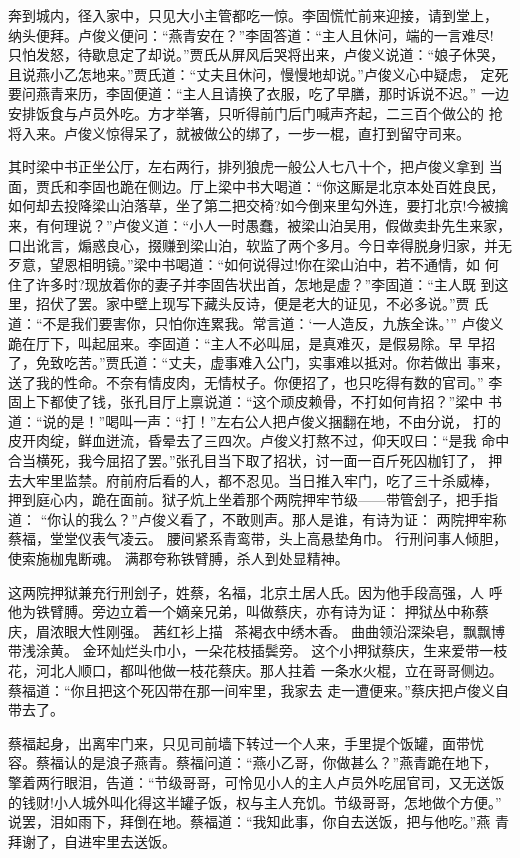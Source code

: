 奔到城内，径入家中，只见大小主管都吃一惊。李固慌忙前来迎接，请到堂上，
纳头便拜。卢俊义便问：“燕青安在？”李固答道：“主人且休问，端的一言难尽!
只怕发怒，待歇息定了却说。”贾氏从屏风后哭将出来，卢俊义说道：“娘子休哭，
且说燕小乙怎地来。”贾氏道：“丈夫且休问，慢慢地却说。”卢俊义心中疑虑，
定死要问燕青来历，李固便道：“主人且请换了衣服，吃了早膳，那时诉说不迟。”
一边安排饭食与卢员外吃。方才举箸，只听得前门后门喊声齐起，二三百个做公的
抢将入来。卢俊义惊得呆了，就被做公的绑了，一步一棍，直打到留守司来。

其时梁中书正坐公厅，左右两行，排列狼虎一般公人七八十个，把卢俊义拿到
当面，贾氏和李固也跪在侧边。厅上梁中书大喝道：“你这厮是北京本处百姓良民，
如何却去投降梁山泊落草，坐了第二把交椅?如今倒来里勾外连，要打北京!今被擒
来，有何理说？”卢俊义道：“小人一时愚蠢，被梁山泊吴用，假做卖卦先生来家，
口出讹言，煽惑良心，掇赚到梁山泊，软监了两个多月。今日幸得脱身归家，并无
歹意，望恩相明镜。”梁中书喝道：“如何说得过!你在梁山泊中，若不通情，如
何住了许多时?现放着你的妻子并李固告状出首，怎地是虚？”李固道：“主人既
到这里，招伏了罢。家中壁上现写下藏头反诗，便是老大的证见，不必多说。”贾
氏道：“不是我们要害你，只怕你连累我。常言道：‘一人造反，九族全诛。’”
卢俊义跪在厅下，叫起屈来。李固道：“主人不必叫屈，是真难灭，是假易除。早
早招了，免致吃苦。”贾氏道：“丈夫，虚事难入公门，实事难以抵对。你若做出
事来，送了我的性命。不奈有情皮肉，无情杖子。你便招了，也只吃得有数的官司。”
李固上下都使了钱，张孔目厅上禀说道：“这个顽皮赖骨，不打如何肯招？”梁中
书道：“说的是！”喝叫一声：“打！”左右公人把卢俊义捆翻在地，不由分说，
打的皮开肉绽，鲜血迸流，昏晕去了三四次。卢俊义打熬不过，仰天叹曰：“是我
命中合当横死，我今屈招了罢。”张孔目当下取了招状，讨一面一百斤死囚枷钉了，
押去大牢里监禁。府前府后看的人，都不忍见。当日推入牢门，吃了三十杀威棒，
押到庭心内，跪在面前。狱子炕上坐着那个两院押牢节级——带管刽子，把手指道：
“你认的我么？”卢俊义看了，不敢则声。那人是谁，有诗为证：
两院押牢称蔡福，堂堂仪表气凌云。
腰间紧系青鸾带，头上高悬垫角巾。
行刑问事人倾胆，使索施枷鬼断魂。
满郡夸称铁臂膊，杀人到处显精神。

这两院押狱兼充行刑刽子，姓蔡，名福，北京土居人氏。因为他手段高强，人
呼他为铁臂膊。旁边立着一个嫡亲兄弟，叫做蔡庆，亦有诗为证：
押狱丛中称蔡庆，眉浓眼大性刚强。
茜红衫上描，茶褐衣中绣木香。
曲曲领沿深染皂，飘飘博带浅涂黄。
金环灿烂头巾小，一朵花枝插鬓旁。
这个小押狱蔡庆，生来爱带一枝花，河北人顺口，都叫他做一枝花蔡庆。那人拄着
一条水火棍，立在哥哥侧边。蔡福道：“你且把这个死囚带在那一间牢里，我家去
走一遭便来。”蔡庆把卢俊义自带去了。

蔡福起身，出离牢门来，只见司前墙下转过一个人来，手里提个饭罐，面带忧
容。蔡福认的是浪子燕青。蔡福问道：“燕小乙哥，你做甚么？”燕青跪在地下，
擎着两行眼泪，告道：“节级哥哥，可怜见小人的主人卢员外吃屈官司，又无送饭
的钱财!小人城外叫化得这半罐子饭，权与主人充饥。节级哥哥，怎地做个方便。”
说罢，泪如雨下，拜倒在地。蔡福道：“我知此事，你自去送饭，把与他吃。”燕
青拜谢了，自进牢里去送饭。

